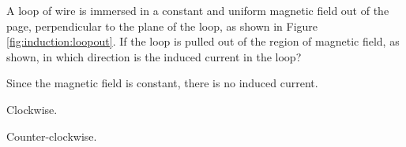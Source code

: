 \begin{checkpoint}{}
	\begin{MCquestion}{A loop of wire is immersed in a constant and uniform magnetic field out of the page, perpendicular to the plane of the loop, as shown in Figure \ref{fig:induction:loopout}. If the loop is pulled out of the region of magnetic field, as shown, in which direction is the induced current in the loop?
	}
		\item Since the magnetic field is constant, there is no induced current.
		\item Clockwise. 
		\item Counter-clockwise.\correct 
	\end{MCquestion}
\end{checkpoint}


